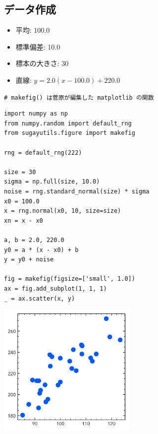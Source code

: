 \documentclass[a4paper, 9pt, notitlepage, uplatex, dvipdfmx]{jsarticle}
\begin{document}
\subsection{データ作成}
\label{sec:orgd3393f0}
\begin{itemize}
\item 平均: 100.0
\item 標準偏差: 10.0
\item 標本の大きさ: 30
\item 直線: \(y = 2.0 (x - 100.0) + 220.0\)
\end{itemize}
\texttt{\# makefig() は菅原が編集した matplotlib の関数}
\begin{verbatim}
import numpy as np
from numpy.random import default_rng
from sugayutils.figure import makefig

rng = default_rng(222)

size = 30
sigma = np.full(size, 10.0)
noise = rng.standard_normal(size) * sigma
x0 = 100.0
x = rng.normal(x0, 10, size=size)
xn = x - x0

a, b = 2.0, 220.0
y0 = a * (x - x0) + b
y = y0 + noise

fig = makefig(figsize=['small', 1.0])
ax = fig.add_subplot(1, 1, 1)
_ = ax.scatter(x, y)
\end{verbatim}

\label{}
\begin{center}
\includegraphics[width=0.5\textwidth]{./obipy-resources/data.png}
\end{center}
\end{document}
